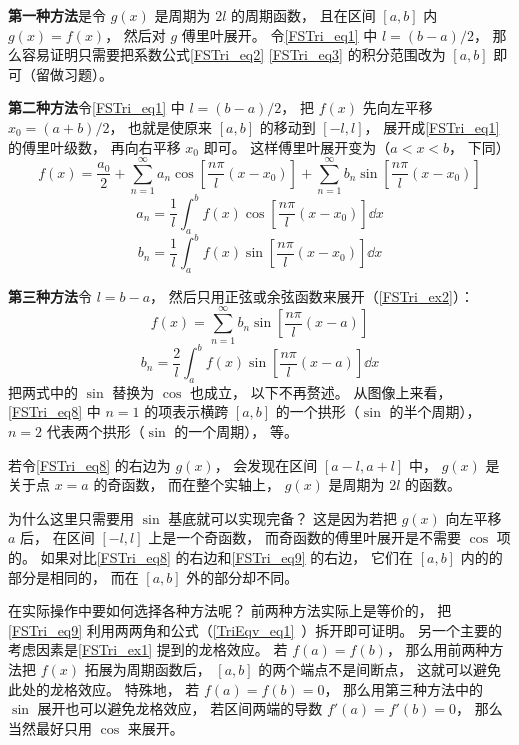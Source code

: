 \textbf{第一种方法}是令 $g(x)$ 是周期为 $2l$ 的周期函数， 且在区间 $[a, b]$ 内 $g(x) = f(x)$， 然后对 $g$ 傅里叶展开。 令\autoref{FSTri_eq1} 中 $l = (b-a)/2$， 那么容易证明只需要把系数公式\autoref{FSTri_eq2} \autoref{FSTri_eq3} 的积分范围改为 $[a,b]$ 即可（留做习题）。

\textbf{第二种方法}令\autoref{FSTri_eq1} 中 $l = (b-a)/2$， 把 $f(x)$ 先向左平移 $x_0 = (a+b)/2$， 也就是使原来 $[a,b]$ 的移动到 $[-l,l]$， 展开成\autoref{FSTri_eq1} 的傅里叶级数， 再向右平移 $x_0$ 即可。 这样傅里叶展开变为（$a < x < b$， 下同）
\begin{equation}\label{FSTri_eq9}
f(x) = \frac{a_0}{2} + \sum_{n = 1}^\infty a_n \cos [\frac{n\pi}{l}(x-x_0)] + \sum_{n = 1}^\infty b_n \sin [\frac{n\pi}{l}(x-x_0)]
\end{equation}
\begin{equation}
a_n = \frac{1}{l} \int_{a}^b f(x)\cos [\frac{n\pi}{l}(x-x_0)] \dd{x} 
\end{equation}
\begin{equation}
b_n = \frac{1}{l} \int_{a}^b f(x)\sin [\frac{n\pi}{l}(x-x_0)] \dd{x}
\end{equation}

\textbf{第三种方法}令 $l = b - a$， 然后只用正弦或余弦函数来展开（\autoref{FSTri_ex2}）：
\begin{equation}\label{FSTri_eq8}
f(x) = \sum_{n = 1}^\infty b_n \sin [\frac{n\pi}{l}(x-a)]
\end{equation}
\begin{equation}
b_n = \frac{2}{l} \int_{a}^b f(x)\sin [\frac{n\pi}{l}(x-a)] \dd{x}
\end{equation}
把两式中的 $\sin$ 替换为 $\cos$ 也成立， 以下不再赘述。 从图像上来看， \autoref{FSTri_eq8} 中 $n=1$ 的项表示横跨 $[a,b]$ 的一个拱形（$\sin$ 的半个周期）， $n=2$ 代表两个拱形（$\sin$ 的一个周期）， 等。

若令\autoref{FSTri_eq8} 的右边为 $g(x)$， 会发现在区间 $[a-l, a+l]$ 中，  $g(x)$ 是关于点 $x = a$ 的奇函数， 而在整个实轴上， $g(x)$ 是周期为 $2l$ 的函数。

为什么这里只需要用 $\sin$ 基底就可以实现完备？ 这是因为若把 $g(x)$ 向左平移 $a$ 后， 在区间 $[-l, l]$ 上是一个奇函数， 而奇函数的傅里叶展开是不需要 $\cos$ 项的。 如果对比\autoref{FSTri_eq8} 的右边和\autoref{FSTri_eq9} 的右边， 它们在 $[a, b]$ 内的的部分是相同的， 而在 $[a, b]$ 外的部分却不同。

在实际操作中要如何选择各种方法呢？ 前两种方法实际上是等价的， 把\autoref{FSTri_eq9} 利用两两角和公式（\autoref{TriEqv_eq1}~）拆开即可证明。 另一个主要的考虑因素是\autoref{FSTri_ex1} 提到的龙格效应。 若 $f(a) = f(b)$， 那么用前两种方法把 $f(x)$ 拓展为周期函数后， $[a,b]$ 的两个端点不是间断点， 这就可以避免此处的龙格效应。 特殊地， 若 $f(a) = f(b) = 0$， 那么用第三种方法中的 $\sin$ 展开也可以避免龙格效应， 若区间两端的导数 $f'(a) = f'(b) = 0$， 那么当然最好只用 $\cos$ 来展开。

